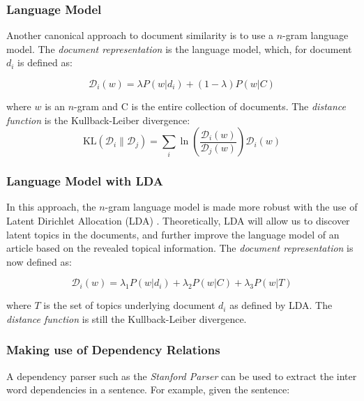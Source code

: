 \documentclass[11pt]{article}
\begin{document}
\subsubsection*{Language Model}

Another canonical approach to document similarity is to use a $n$-gram language model.  The \emph{document representation} is the language model, which, for document $d_i$ is defined as:

\begin{equation}
\mathcal{D}_i(w) = \lambda P(w|d_i) + (1 - \lambda) P(w| C)
\end{equation}

where $w$ is an $n$-gram and C is the entire collection of documents. The \emph{distance function} is the Kullback-Leiber divergence: 
\begin{equation}
{\mathrm{KL}}(\mathcal{D}_i\|\mathcal{D}_j) = \sum_i \ln\left(\frac{\mathcal{D}_i(w)}{\mathcal{D}_j(w)}\right) \mathcal{D}_i(w)
\end{equation}

\subsubsection*{Language Model with LDA}

In this approach, the $n$-gram language model is made more robust with the use of Latent Dirichlet Allocation (LDA) \cite{Blei2003}. Theoretically, LDA will allow us to discover latent topics in the documents, and further improve the language model of an article based on the revealed topical information.  The \emph{document representation} is now defined as: 

\begin{equation}
\mathcal{D}_i(w) = \lambda_1 P(w|d_i) + \lambda_2 P(w| C) + \lambda_3 P(w|T)
\end{equation}

where $T$ is the set of topics underlying document $d_i$ as defined by LDA. The \emph{distance function} is still the Kullback-Leiber divergence. 

\subsubsection{Making use of Dependency Relations} \label{sec:DependencyParsing}

A dependency parser such as the \emph{Stanford Parser} \cite{DeMarneffe2006} can be used to extract the inter word dependencies in a sentence. For example, given the sentence:
\end{document}
